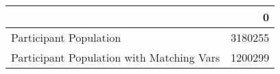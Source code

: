 \begin{tabular}{lr}
\toprule
{} &        0 \\
\midrule
Participant Population                    &  3180255 \\
Participant Population with Matching Vars &  1200299 \\
\bottomrule
\end{tabular}

